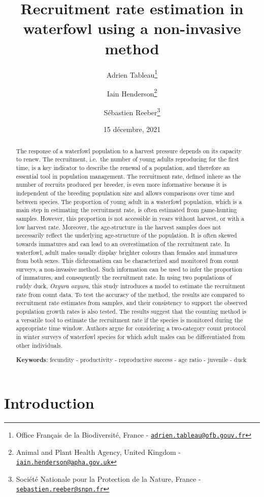 \documentclass[
  english,
]{article}
\title{Recruitment rate estimation in waterfowl using a non-invasive method}
\author{Adrien Tableau\footnote{Office Français de la Biodiversité, France - \href{mailto:adrien.tableau@ofb.gouv.fr}{\nolinkurl{adrien.tableau@ofb.gouv.fr}}} \and Iain Henderson\footnote{Animal and Plant Health Agency, United Kingdom - \href{mailto:iain.henderson@apha.gov.uk}{\nolinkurl{iain.henderson@apha.gov.uk}}} \and Sébastien Reeber\footnote{Société Nationale pour la Protection de la Nature, France - \href{mailto:sebastien.reeber@snpn.fr}{\nolinkurl{sebastien.reeber@snpn.fr}}}}
\date{15 décembre, 2021}
\begin{document}
\maketitle
\begin{abstract}
The response of a waterfowl population to a harvest pressure depends on its capacity to renew. The recruitment, i.e.~the number of young adults reproducing for the first time, is a key indicator to describe the renewal of a population, and therefore an essential tool in population management. The recruitment rate, defined inhere as the number of recruits produced per breeder, is even more informative because it is independent of the breeding population size and allows comparisons over time and between species. The proportion of young adult in a waterfowl population, which is a main step in estimating the recruitment rate, is often estimated from game-hunting samples. However, this proportion is not accessible in years without harvest, or with a low harvest rate. Moreover, the age-structure in the harvest samples does not necessarily reflect the underlying age-structure of the population. It is often skewed towards immatures and can lead to an overestimation of the recruitment rate. In waterfowl, adult males usually display brighter colours than females and immatures from both sexes. This dichromatism can be characterized and monitored from count surveys, a non-invasive method. Such information can be used to infer the proportion of immatures, and consequently the recruitment rate. In using two populations of ruddy duck, \emph{Oxyura oxyura}, this study introduces a model to estimate the recruitment rate from count data. To test the accuracy of the method, the results are compared to recruitment rate estimates from samples, and their consistency to support the observed population growth rates is also tested. The results suggest that the counting method is a versatile tool to estimate the recruitment rate if the species is monitored during the appropriate time window. Authors argue for considering a two-category count protocol in winter surveys of waterfowl species for which adult males can be differentiated from other individuals.

\textbf{Keywords}: fecundity - productivity - reproductive success - age ratio - juvenile - duck
\end{abstract}

\newpage

\hypertarget{introduction}{%
\section{Introduction}\label{introduction}}
\end{document}
